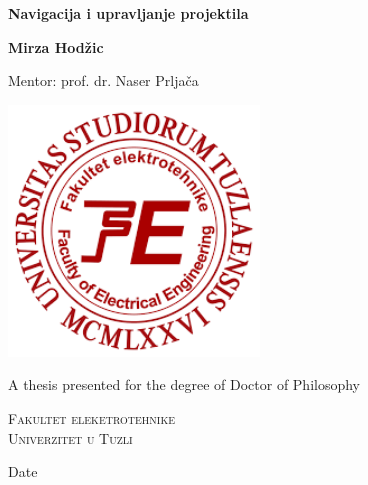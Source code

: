 \begin{titlepage}
    \begin{center}
        \vspace*{1cm}
        
        \Huge
        \textbf{Navigacija i upravljanje projektila}
        
        
        
        \vspace{1.5cm}
        
        \Large
        \textbf{Mirza Hodžic}\\
        
        \vspace{0.5cm}
        
        Mentor: prof. dr. Naser Prljača\\
        
        \vfill
        
        \includegraphics[width=0.5\textwidth]{Images/preuzmi.png}
        
        \vspace{0.8cm}
        
        \Large
        A thesis presented for the degree of Doctor of Philosophy
        
        \vspace{0.5cm}
        
        \LARGE
	    \textsc{Fakultet eleketrotehnike\\
	    Univerzitet u Tuzli}
	    
	    \begin{flushright}
	
	    \Large
	    Date
	
	    \end{flushright}
        
    \end{center}
\end{titlepage}